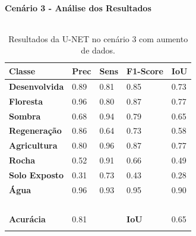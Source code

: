 \documentclass[%
  10pt,%
  aspectratio = 169,%
  compress,%
  t,%
  english,%
  brazilian,%
  tikz,
]{beamer}
\begin{document}
\begin{frame}
\framesubtitle{Cenário 3 - Análise dos Resultados}

\begin{columns}[T]

\begin{table}[!ht]
    \centering
    \caption{Resultados da U-NET no cenário 3 com aumento de dados.}%
    \label{tab:res:cen31}%
    \begin{tabular}{lllll}
    \toprule
        \textbf{Classe} & \textbf{Prec} & \textbf{Sens} & \textbf{F1-Score} & \textbf{IoU} \\
        \midrule
        \textbf{Desenvolvida}               & 0.89 & 0.81 & 0.85 & 0.73 \\ 
        \textbf{Floresta}                   & 0.96 & 0.80 & 0.87 & 0.77 \\ 
        \textbf{Sombra}                     & 0.68 & 0.94 & 0.79 & 0.65 \\ 
        \textbf{Regeneração}                & 0.86 & 0.64 & 0.73 & 0.58 \\ 
        \textbf{Agricultura}                & 0.80 & 0.96 & 0.87 & 0.77 \\ 
        \textbf{Rocha}                      & 0.52 & 0.91 & 0.66 & 0.49 \\ 
        \textbf{Solo Exposto}               & 0.31 & 0.73 & 0.43 & 0.28 \\ 
        \textbf{Água}                       & 0.96 & 0.93 & 0.95 & 0.90 \\ 
        \textbf{} & ~ & ~ & ~ & ~ \\ 
        \textbf{Acurácia} & 0.81 & ~ & \textbf{IoU} & 0.65 \\
        \bottomrule
        \addlinespace
    \end{tabular}
\end{table}



\end{columns}
\end{frame}
\end{document}
